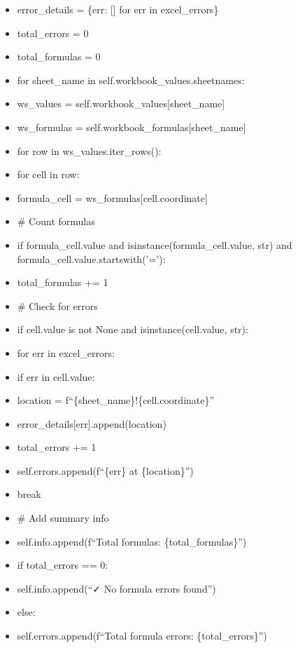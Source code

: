 \documentclass[11pt]{article}
\begin{document}
\begin{itemize}[leftmargin=*,itemsep=2pt,topsep=2pt]
\item {} error\_\allowbreak{}details = \{err: [] for err in excel\_\allowbreak{}errors\}
\item {} total\_\allowbreak{}errors = 0
\item {} total\_\allowbreak{}formulas = 0
\item {} for sheet\_\allowbreak{}name in self.workbook\_\allowbreak{}values.sheetnames:
\item {} ws\_\allowbreak{}values = self.workbook\_\allowbreak{}values[sheet\_\allowbreak{}name]
\item {} ws\_\allowbreak{}formulas = self.workbook\_\allowbreak{}formulas[sheet\_\allowbreak{}name]
\item {} for row in ws\_\allowbreak{}values.iter\_\allowbreak{}rows():
\item {} for cell in row:
\item {} formula\_\allowbreak{}cell = ws\_\allowbreak{}formulas[cell.coordinate]
\item {} \# Count formulas
\item {} if formula\_\allowbreak{}cell.value and isinstance(formula\_\allowbreak{}cell.value, str) and formula\_\allowbreak{}cell.value.startswith('='):
\item {} total\_\allowbreak{}formulas += 1
\item {} \# Check for errors
\item {} if cell.value is not None and isinstance(cell.value, str):
\item {} for err in excel\_\allowbreak{}errors:
\item {} if err in cell.value:
\item {} location = f``\{sheet\_\allowbreak{}name\}!\{cell.coordinate\}''
\item {} error\_\allowbreak{}details[err].append(location)
\item {} total\_\allowbreak{}errors += 1
\item {} self.errors.append(f``\{err\} at \{location\}'')
\item {} break
\item {} \# Add summary info
\item {} self.info.append(f``Total formulas: \{total\_\allowbreak{}formulas\}'')
\item {} if total\_\allowbreak{}errors == 0:
\item {} self.info.append(``✓ No formula errors found'')
\item {} else:
\item {} self.errors.append(f``Total formula errors: \{total\_\allowbreak{}errors\}'')

\end{itemize}
\end{document}
